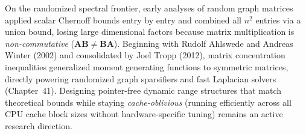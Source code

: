 \begin{historybox}
On the randomized spectral frontier, early analyses of random graph matrices applied scalar Chernoff bounds entry by entry and combined all $n^2$ entries via a union bound, losing large dimensional factors because matrix multiplication is \emph{non-commutative} ($\mathbf{A}\mathbf{B} \ne \mathbf{B}\mathbf{A}$). Beginning with Rudolf Ahlswede and Andreas Winter (2002) and consolidated by Joel Tropp (2012), matrix concentration inequalities generalized moment generating functions to symmetric matrices, directly powering randomized graph sparsifiers and fast Laplacian solvers (Chapter~41). Designing pointer-free dynamic range structures that match theoretical bounds while staying \emph{cache-oblivious} (running efficiently across all CPU cache block sizes without hardware-specific tuning) remains an active research direction.
\end{historybox}

